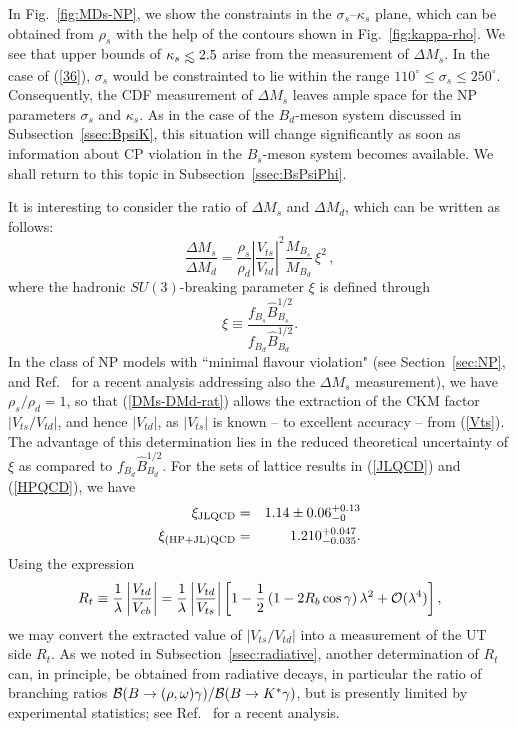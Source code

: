 \documentclass[12pt]{article}
\newcommand{\lsim}{
\mathrel{\hbox{\rlap{\hbox{\lower4pt\hbox{$\sim$}}}\hbox{$<$}}}}
\begin{document}
In Fig.~\ref{fig:MDs-NP}, we show the constraints in the $\sigma_s$--$\kappa_s$ 
plane, which can be obtained from $\rho_s$ with the help of the contours
shown in Fig.~\ref{fig:kappa-rho}. We see that  upper bounds of $\kappa_s\lsim 2.5$
arise from the measurement of $\Delta M_s$. In the case of (\ref{36}), 
$\sigma_s$ would be constrainted to lie within the range 
$110^\circ\leq\sigma_s\leq250^\circ$. Consequently, the CDF measurement of 
$\Delta M_s$ leaves ample space for the NP parameters $\sigma_s$ and 
$\kappa_s$. As in the case of the $B_d$-meson system discussed in
Subsection~\ref{ssec:BpsiK}, this situation will change significantly 
as soon as information about CP violation in the $B_s$-meson system becomes
available. We shall return to this topic in Subsection~\ref{ssec:BsPsiPhi}.

It is interesting to consider the ratio of $\Delta M_s$ and $\Delta M_d$,
which can be written as follows:
\begin{equation}\label{DMs-DMd-rat}
\frac{\Delta M_s}{\Delta M_d} =  \frac{\rho_s}{\rho_d}
\left|\frac{V_{ts}}{V_{td}}\right|^2 \frac{M_{B_s}}{M_{B_d}}\, \xi^2\,,
\end{equation}
where the hadronic $SU(3)$-breaking parameter $\xi$ is defined  through
\begin{equation}
\xi \equiv 
\frac{f_{B_s}\hat{B}_{B_s}^{1/2}}{f_{B_d}\hat{B}_{B_d}^{1/2}}.
\end{equation}
In the class of NP models with
``minimal flavour violation" (see Section~\ref{sec:NP}, and Ref.~\cite{BBGT} for 
a recent analysis addressing also the $\Delta M_s$ measurement), 
we have $\rho_s/\rho_d=1$, so that (\ref{DMs-DMd-rat}) 
allows the extraction of the CKM factor $|V_{ts}/V_{td}|$, and hence
$|V_{td}|$, as $|V_{ts}|$ is known -- to excellent accuracy -- from (\ref{Vts}). The advantage of this determination lies in the reduced theoretical uncertainty of $\xi$ as compared to $f_{B_d}\hat B_{B_d}^{1/2}$. For the sets of lattice results in
(\ref{JLQCD}) and (\ref{HPQCD}), we have
\begin{eqnarray}
\xi_{\rm JLQCD} & = & 1.14\pm 0.06^{+0.13}_{-0}\label{xi-JLQCD}\\
\xi_{\rm (HP+JL)QCD} & = &
1.210^{+0.047}_{-0.035}.\label{xi-HPJL}
\end{eqnarray}
Using the expression
\begin{equation}\label{Rt-def2}
R_t \equiv \frac{1}{\lambda}\left|\frac{V_{td}}{V_{cb}}\right| 
=  \frac{1}{\lambda}\left|\frac{V_{td}}{V_{ts}}\right| \left[ 
1-\frac{1}{2}\left(1-2R_b\cos\gamma\right)\lambda^2+{\cal O}(\lambda^4)\right],
\end{equation}
we may convert the extracted value of $|V_{ts}/V_{td}|$ into a measurement of the UT
side $R_t$. As we noted in Subsection~\ref{ssec:radiative}, another determination of $R_t$ can, in principle, be obtained from radiative decays, in particular the ratio of 
branching ratios ${\cal B}(B\to (\rho,\omega)\gamma)/{\cal B}(B\to K^*\gamma)$, 
but is presently limited by experimental statistics; see Ref.~\cite{VtdVts} for a 
recent analysis. 
\end{document}
